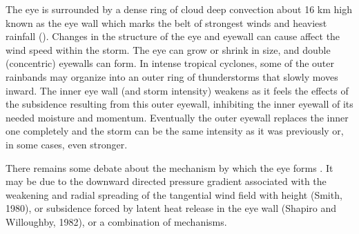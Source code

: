 The eye is surrounded by a dense ring of cloud deep convection about 16 km high known as the eye wall which marks the belt of strongest winds and heaviest rainfall (\citep{bom_tc}). Changes in the structure of the eye and eyewall can cause affect the wind speed within the storm. The eye can grow or shrink in size, and double (concentric) eyewalls can form. In intense tropical cyclones, some of the outer rainbands may organize into an outer ring of thunderstorms that slowly moves inward. The inner eye wall (and storm intensity) weakens as it feels the effects of the subsidence resulting from this outer eyewall, inhibiting the inner eyewall of its needed moisture and momentum. Eventually the outer eyewall replaces the inner one completely and the storm can be the same intensity as it was previously or, in some cases, even stronger.%

There remains some debate about the mechanism by which the eye forms \citep{noaa_a11}. It may be due to the downward directed pressure gradient associated with the weakening and radial spreading of the tangential wind field with height (Smith, 1980), or subsidence forced by latent heat release in the eye wall (Shapiro and Willoughby, 1982), or a combination of mechanisms.



